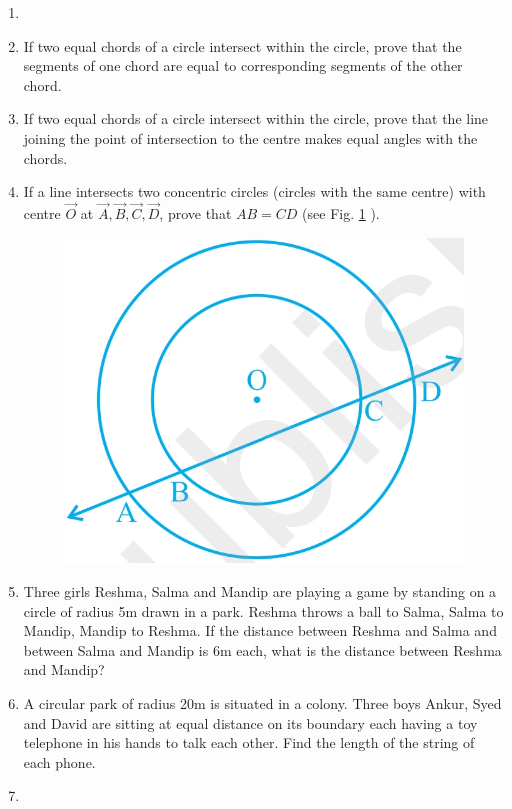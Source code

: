 \begin{enumerate}[label=\thesection.\arabic*,ref=\thesection.\theenumi]
\item 
\label{chapters/9/10/4/1}

\item If two equal chords of a circle intersect within the circle, prove 
that the segments of one chord are equal to corresponding segments of the other 
chord.
\label{chapters/9/10/4/2}
\\
\solution 

\item If two equal chords of a circle intersect within the circle, prove 
that the line joining the point of intersection to the centre makes equal 
angles with the chords.
\\
\solution 
%
\item If a line intersects two concentric circles (circles with the same 
centre) with centre $\vec{O}$ at $\vec{A}, \vec{B}, \vec{C}, \vec{D}$, prove 
that $AB = CD$ (see Fig. 
		\ref{fig:chapters/9/10/41} ).
\begin{figure}[!ht]
    \centering
    \includegraphics[width=\columnwidth]{chapters/9/10/4/figs/fig1.jpg}
    \caption{}
    \label{fig:chapters/9/10/41}
\end{figure}
\item Three girls Reshma, Salma and Mandip are playing a game by standing on 
a circle of radius 5m drawn in a park. Reshma throws a ball to Salma, Salma to 
Mandip, Mandip to Reshma. If the distance between Reshma and Salma and between 
Salma and Mandip is 6m each, what is the distance between Reshma and Mandip?
\\
\solution 

\item A circular park of radius 20m is situated in a colony. Three boys Ankur,
Syed and David are sitting at equal distance on its boundary each having a toy 
telephone in his hands to talk each other. Find the length of the string of each 
phone.
\item 
\label{chapters/9/10/4/6}



\end{enumerate}
